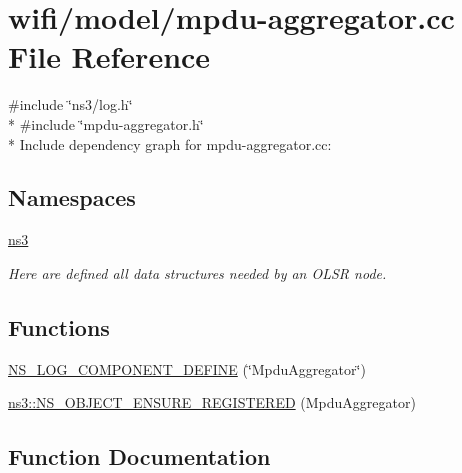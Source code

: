 \hypertarget{mpdu-aggregator_8cc}{}\section{wifi/model/mpdu-\/aggregator.cc File Reference}
\label{mpdu-aggregator_8cc}
{\ttfamily \#include \char`\"{}ns3/log.\+h\char`\"{}}\\*
{\ttfamily \#include \char`\"{}mpdu-\/aggregator.\+h\char`\"{}}\\*
Include dependency graph for mpdu-\/aggregator.cc\+:
\subsection*{Namespaces}
\begin{DoxyCompactItemize}
\item 
 \hyperlink{namespacens3}{ns3}
\begin{DoxyCompactList}\small\item\em Here are defined all data structures needed by an O\+L\+SR node. \end{DoxyCompactList}\end{DoxyCompactItemize}
\subsection*{Functions}
\begin{DoxyCompactItemize}
\item 
\hyperlink{mpdu-aggregator_8cc_a096889e36406c84a926ff4d43a97570e}{N\+S\+\_\+\+L\+O\+G\+\_\+\+C\+O\+M\+P\+O\+N\+E\+N\+T\+\_\+\+D\+E\+F\+I\+NE} (\char`\"{}Mpdu\+Aggregator\char`\"{})
\item 
\hyperlink{namespacens3_af355efbe2ea21eb554442ce7686c2c24}{ns3\+::\+N\+S\+\_\+\+O\+B\+J\+E\+C\+T\+\_\+\+E\+N\+S\+U\+R\+E\+\_\+\+R\+E\+G\+I\+S\+T\+E\+R\+ED} (Mpdu\+Aggregator)
\end{DoxyCompactItemize}


\subsection{Function Documentation}
